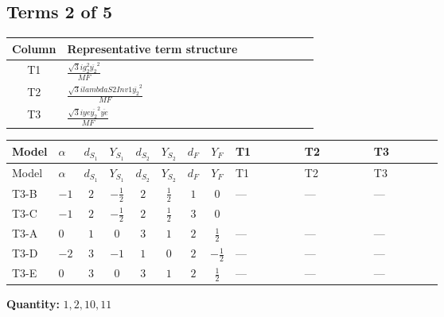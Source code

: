\documentclass[8pt]{article}
\begin{document}
\begin{landscape}
\subsection*{Terms 2 of 5}
\begin{center}
\begin{tabular}{@{}c >{\raggedright\arraybackslash}p{0.82\linewidth}@{}}
\toprule
Column & Representative term structure \\
\midrule
T1 & \(\displaystyle \frac{\sqrt{3} i g_{2}^{2} \overline{y_{2}}^{2}}{MF}\) \\
\midrule
T2 & \(\displaystyle \frac{\sqrt{3} i lambdaS2Inv1 \overline{y_{2}}^{2}}{MF}\) \\
\midrule
T3 & \(\displaystyle \frac{\sqrt{3} i ye \overline{y_{2}}^{2} \overline{ye}}{MF}\) \\
\midrule
\bottomrule
\end{tabular}
\end{center}
\smallskip
\tiny
\begin{longtable}{@{}llcccccc >{\raggedright\arraybackslash}p{0.21\linewidth} >{\raggedright\arraybackslash}p{0.21\linewidth} >{\raggedright\arraybackslash}p{0.21\linewidth}@{}}
\toprule
Model & $\alpha$ & $d_{S_1}$ & $Y_{S_1}$ & $d_{S_2}$ & $Y_{S_2}$ & $d_F$ & $Y_F$ & T1 & T2 & T3 \\
\midrule
\endfirsthead
\toprule
Model & $\alpha$ & $d_{S_1}$ & $Y_{S_1}$ & $d_{S_2}$ & $Y_{S_2}$ & $d_F$ & $Y_F$ & T1 & T2 & T3 \\
\midrule
\endhead
T3-B & $-1$ & $2$ & $-\frac{1}{2}$ & $2$ & $\frac{1}{2}$ & $1$ & $0$ & --- & --- & --- \\
\midrule
T3-C & $-1$ & $2$ & $-\frac{1}{2}$ & $2$ & $\frac{1}{2}$ & $3$ & $0$ & \scriptsize\adjustbox{max width=\linewidth}{$\begin{gathered} \frac{\sqrt{3} i g_{2}^{2} \overline{y_{2}}^{2}}{8 MF}\end{gathered}$} & \scriptsize\adjustbox{max width=\linewidth}{$\begin{gathered} \frac{\sqrt{3} i lambdaS2Inv1 \overline{y_{2}}^{2}}{12 MF}\end{gathered}$} & \scriptsize\adjustbox{max width=\linewidth}{$\begin{gathered} - \frac{\sqrt{3} i ye \overline{y_{2}}^{2} \overline{ye}}{24 MF}\end{gathered}$} \\
\midrule
T3-A & $0$ & $1$ & $0$ & $3$ & $1$ & $2$ & $\frac{1}{2}$ & --- & --- & --- \\
\midrule
T3-D & $-2$ & $3$ & $-1$ & $1$ & $0$ & $2$ & $-\frac{1}{2}$ & --- & --- & --- \\
\midrule
T3-E & $0$ & $3$ & $0$ & $3$ & $1$ & $2$ & $\frac{1}{2}$ & --- & --- & --- \\
\midrule
\bottomrule
\end{longtable}
\clearpage
\noindent\textbf{Quantity: }$\mathrm{1,2,10,11}$\par\smallskip

\end{landscape}
\end{document}
